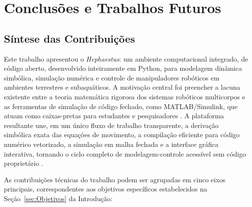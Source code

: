 \chapter{Conclusões e Trabalhos Futuros}
\label{cap:conclusoes}

\section{Síntese das Contribuições}

Este trabalho apresentou o \textit{Hephaestus}: um ambiente computacional integrado, de código aberto, desenvolvido inteiramente em Python, para modelagem dinâmica simbólica, simulação numérica e controle de manipuladores robóticos em ambientes terrestres e subaquáticos. A motivação central foi preencher a lacuna existente entre a teoria matemática rigorosa dos sistemas robóticos multicorpos e as ferramentas de simulação de código fechado, como MATLAB/Simulink, que atuam como caixas-pretas para estudantes e pesquisadores \cite{corke2021toolbox}. A plataforma resultante une, em um único fluxo de trabalho transparente, a derivação simbólica exata das equações de movimento, a compilação eficiente para código numérico vetorizado, a simulação em malha fechada e a interface gráfica interativa, tornando o ciclo completo de modelagem-controle acessível sem código proprietário \cite{meurer2017sympy, leu1986automated}.

As contribuições técnicas do trabalho podem ser agrupadas em cinco eixos principais, correspondentes aos objetivos específicos estabelecidos na Seção~\ref{sec:Objetivos} da Introdução:

